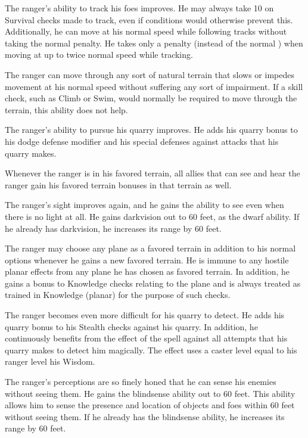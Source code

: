  The ranger's ability to track his foes improves. He may always take 10 on Survival checks made to track, even if conditions would otherwise prevent this. Additionally, he can move at his normal speed while following tracks without taking the normal  penalty. He takes only a  penalty (instead of the normal ) when moving at up to twice normal speed while tracking.

 The ranger can move through any sort of natural terrain that slows or impedes movement at his normal speed without suffering any sort of impairment. If a skill check, such as Climb or Swim, would normally be required to move through the terrain, this ability does not help.

 The ranger's ability to pursue his quarry improves. He adds his quarry bonus to his dodge defense modifier and his special defenses against attacks that his quarry makes.

 Whenever the ranger is in his favored terrain, all allies that can see and hear the ranger gain his favored terrain bonuses in that terrain as well.

 The ranger's sight improves again, and he gains the ability to see even when there is no light at all. He gains darkvision out to 60 feet, as the dwarf ability. If he already has darkvision, he increases its range by 60 feet.

 The ranger may choose any plane as a favored terrain in addition to his normal options whenever he gains a new favored terrain. He is immune to any hostile planar effects from any plane he has chosen as favored terrain. In addition, he gains a  bonus to Knowledge checks relating to the plane and is always treated as trained in Knowledge (planar) for the purpose of such checks.

 The ranger becomes even more difficult for his quarry to detect. He adds his quarry bonus to his Stealth checks against his quarry. In addition, he continuously benefits from the effect of the  spell against all attempts that his quarry makes to detect him magically. The effect uses a caster level equal to his ranger level \add his Wisdom.

 The ranger's perceptions are so finely honed that he can sense his enemies without seeing them. He gains the blindsense ability out to 60 feet. This ability allows him to sense the presence and location of objects and foes within 60 feet without seeing them. If he already has the blindsense ability, he increases its range by 60 feet.

